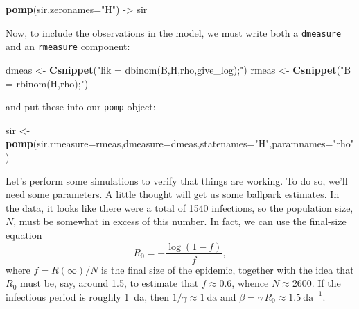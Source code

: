 \documentclass[]{article}
\newenvironment{Shaded}{\begin{snugshade}}{\end{snugshade}}
\newcommand{\KeywordTok}[1]{\textcolor[rgb]{0.13,0.29,0.53}{\textbf{#1}}}
\newcommand{\DataTypeTok}[1]{\textcolor[rgb]{0.13,0.29,0.53}{#1}}
\newcommand{\StringTok}[1]{\textcolor[rgb]{0.31,0.60,0.02}{#1}}
\newcommand{\NormalTok}[1]{#1}
\begin{document}
\begin{Shaded}
\begin{Highlighting}[]
\KeywordTok{pomp}\NormalTok{(sir,}\DataTypeTok{zeronames=}\StringTok{"H"}\NormalTok{) ->}\StringTok{ }\NormalTok{sir}
\end{Highlighting}
\end{Shaded}

Now, to include the observations in the model, we must write both a
\texttt{dmeasure} and an \texttt{rmeasure} component:

\begin{Shaded}
\begin{Highlighting}[]
\NormalTok{dmeas <-}\StringTok{ }\KeywordTok{Csnippet}\NormalTok{(}\StringTok{"lik = dbinom(B,H,rho,give_log);"}\NormalTok{)}
\NormalTok{rmeas <-}\StringTok{ }\KeywordTok{Csnippet}\NormalTok{(}\StringTok{"B = rbinom(H,rho);"}\NormalTok{)}
\end{Highlighting}
\end{Shaded}

and put these into our \texttt{pomp} object:

\begin{Shaded}
\begin{Highlighting}[]
\NormalTok{sir <-}\StringTok{ }\KeywordTok{pomp}\NormalTok{(sir,}\DataTypeTok{rmeasure=}\NormalTok{rmeas,}\DataTypeTok{dmeasure=}\NormalTok{dmeas,}\DataTypeTok{statenames=}\StringTok{"H"}\NormalTok{,}\DataTypeTok{paramnames=}\StringTok{"rho"}\NormalTok{)}
\end{Highlighting}
\end{Shaded}

Let's perform some simulations to verify that things are working. To do
so, we'll need some parameters. A little thought will get us some
ballpark estimates. In the data, it looks like there were a total of
1540 infections, so the population size, \(N\), must be somewhat in
excess of this number. In fact, we can use the final-size equation
\[R_0 = -\frac{\log{(1-f)}}{f},\] where \(f=R(\infty)/N\) is the final
size of the epidemic, together with the idea that \(R_0\) must be, say,
around 1.5, to estimate that \(f\approx 0.6\), whence \(N\approx 2600\).
If the infectious period is roughly 1~da, then
\(1/\gamma \approx 1~\text{da}\) and
\(\beta = \gamma\,R_0 \approx 1.5~\text{da}^{-1}\).
\end{document}
